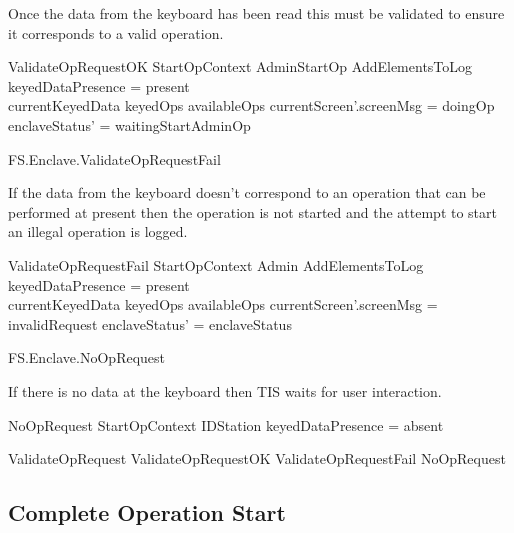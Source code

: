 Once the data from the keyboard has been read this must be validated
to ensure it corresponds to a valid operation.


\begin{schema}{ValidateOpRequestOK}
        StartOpContext
\also
        AdminStartOp
\also
        AddElementsToLog
\where
        keyedDataPresence = present
\\      currentKeyedData  \in keyedOps \limg availableOps \rimg
\also
        currentScreen'.screenMsg = doingOp
\also
        enclaveStatus' = waitingStartAdminOp
\end{schema}

\begin{traceunit}{FS.Enclave.ValidateOpRequestFail}
\end{traceunit}

If the data from the keyboard doesn't correspond to an operation that
can be performed at present then the operation is not started and the
attempt to start an illegal operation is logged.

\begin{schema}{ValidateOpRequestFail}
        StartOpContext
\also
        \Xi Admin
\also
        AddElementsToLog
\where
        keyedDataPresence = present
\\      currentKeyedData  \notin keyedOps \limg availableOps \rimg
\also
        currentScreen'.screenMsg = invalidRequest
\also
        enclaveStatus' = enclaveStatus
\end{schema}


\begin{traceunit}{FS.Enclave.NoOpRequest}
\end{traceunit}


If there is no data at the keyboard then TIS waits for user interaction.

\begin{schema}{NoOpRequest}
        StartOpContext
\also
        \Xi IDStation
\where
        keyedDataPresence = absent
\end{schema}

\begin{zed}
        ValidateOpRequest  ValidateOpRequestOK \lor
        ValidateOpRequestFail \lor NoOpRequest
\end{zed}

\subsection{Complete Operation Start}


